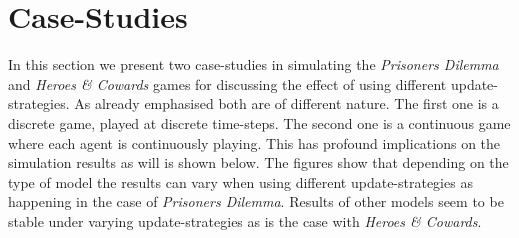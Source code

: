 \section{Case-Studies}
In this section we present two case-studies in simulating the \textit{Prisoners Dilemma} and \textit{Heroes \& Cowards} games for discussing the effect of using different update-strategies. As already emphasised both are of different nature. The first one is a discrete game, played at discrete time-steps. The second one is a continuous game where each agent is continuously playing. This has profound implications on the simulation results as will is shown below. The figures show that depending on the type of model the results can vary when using different update-strategies as happening in the case of \textit{Prisoners Dilemma}. Results of other models seem to be stable under varying update-strategies as is the case with \textit{Heroes \& Cowards}.

